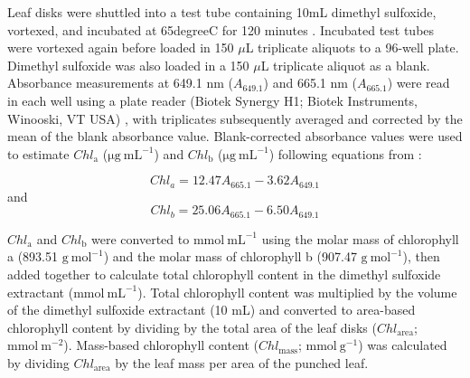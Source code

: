 Leaf disks were shuttled into a test tube containing 10mL dimethyl sulfoxide, vortexed, and incubated at 65\text degree{}C for 120 minutes . Incubated test tubes were vortexed again before loaded in 150 $\mu$L triplicate aliquots to a 96-well plate. Dimethyl sulfoxide was also loaded in a 150 $\mu$L triplicate aliquot as a blank. Absorbance measurements at 649.1 nm ($A_{649.1}$) and 665.1 nm ($A_{665.1}$) were read in each well using a plate reader (Biotek Synergy H1; Biotek Instruments, Winooski, VT USA) , with triplicates subsequently averaged and corrected by the mean of the blank absorbance value. Blank-corrected absorbance values were used to estimate $Chl_\mathrm{a}$ ($\mathrm{\mu g\ mL^{-1}}$) and $Chl_\mathrm{b}$ ($\mathrm{\mu g\ mL^{-1}}$) following equations from :

\begin{equation} \label{eq_5.1}
    Chl_{a}=12.47A_{665.1}-3.62A_{649.1}
\end{equation}
\noindent and
\begin{equation} \label{eq_5.2}
    Chl_{b}=25.06A_{665.1}-6.50A_{649.1}
\end{equation}
    
\noindent $Chl_\mathrm{a}$ and $Chl_\mathrm{b}$ were converted to $\mathrm{mmol\ mL^{-1}}$ using the molar mass of chlorophyll a (893.51 $\mathrm{g\ mol^{-1}}$) and the molar mass of chlorophyll b (907.47 $\mathrm{g\ mol^{-1}}$), then added together to calculate total chlorophyll content in the dimethyl sulfoxide extractant ($\mathrm{mmol\ mL^{-1}}$). Total chlorophyll content was multiplied by the volume of the dimethyl sulfoxide extractant (10 mL) and converted to area-based chlorophyll content by dividing by the total area of the leaf disks ($Chl_\mathrm{area}$; $\mathrm{mmol\ m^{-2}}$). Mass-based chlorophyll content ($Chl_\mathrm{mass}$; $\mathrm{mmol\ g^{-1}}$) was calculated by dividing $Chl_\mathrm{area}$ by the leaf mass per area of the punched leaf.

